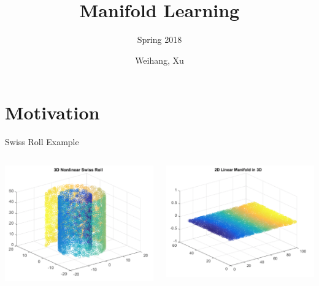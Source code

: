 \documentclass[xcolor={dvipsnames,table}]{beamer}
\title{Manifold Learning}
\subtitle{Spring 2018 }
\author{Weihang, Xu}
\date{}
\begin{document}
\begin{frame}
\titlepage
\end{frame}


\section{Motivation}

\begin{frame}
\end{frame}

\begin{frame}{Swiss Roll Example}
	\begin{columns}
		\begin{column}{0.5\textwidth}
   			\includegraphics[width=0.9\linewidth]{motive1.png}
		\end{column}
		\begin{column}{0.5\textwidth}  %
    		\begin{center}
     		\includegraphics[width=0.9\linewidth]{motive2.png}
     		\end{center}
		\end{column}
	\end{columns}
\end{frame}
\end{document}
